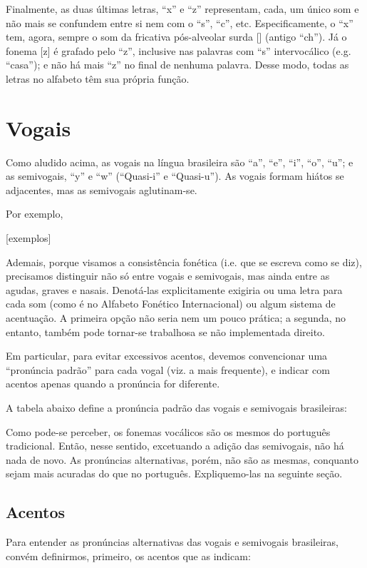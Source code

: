 \documentclass[12pt, a5paper, titlepage]{article}
\begin{document}
\begin{bilingualpages}
    Finalmente, as duas últimas letras, ``x'' e ``z'' representam, cada, um único
    som e não mais se confundem entre si nem com o ``s'', ``c'', etc.
    Especificamente, o ``x'' tem, agora, sempre o som da fricativa pós-alveolar
    surda [\textesh] (antigo ``ch''). Já o fonema [z] é grafado pelo ``z'',
    inclusive nas palavras com ``s'' intervocálico (e.g. ``casa''); e não há mais
    ``z'' no final de nenhuma palavra. Desse modo, todas as letras no alfabeto têm
    sua própria função.

    \section{Vogais}
    Como aludido acima, as vogais na língua brasileira são ``a'', ``e'', ``i'',
    ``o'', ``u''; e as semivogais, ``y'' e ``w'' (``Quasi-i'' e ``Quasi-u''). As
    vogais formam hiátos se adjacentes, mas as semivogais aglutinam-se.

    Por exemplo,

    [exemplos]

    Ademais, porque visamos a consistência fonética (i.e. que se escreva como se
    diz), precisamos distinguir não só entre vogais e semivogais, mas ainda entre
    as agudas, graves e nasais. Denotá-las explicitamente exigiria ou uma letra
    para cada som (como é no Alfabeto Fonético Internacional) ou algum sistema de
    acentuação. A primeira opção não seria nem um pouco prática; a segunda, no
    entanto, também pode tornar-se trabalhosa se não implementada direito.

    Em particular, para evitar excessivos acentos, devemos convencionar uma
    ``pronúncia padrão'' para cada vogal (viz. a mais frequente), e indicar com
    acentos apenas quando a pronúncia for diferente.

    A tabela abaixo define a pronúncia padrão das vogais e semivogais brasileiras:

    \PtTableVowels

    Como pode-se perceber, os fonemas vocálicos são os mesmos do português
    tradicional. Então, nesse sentido, excetuando a adição das semivogais, não há
    nada de novo. As pronúncias alternativas, porém, não são as mesmas, conquanto
    sejam mais acuradas do que no português. Expliquemo-las na seguinte seção.

    \subsection{Acentos}
    Para entender as pronúncias alternativas das vogais e semivogais brasileiras,
    convém definirmos, primeiro, os acentos que as indicam:


\end{bilingualpages}
\end{document}
